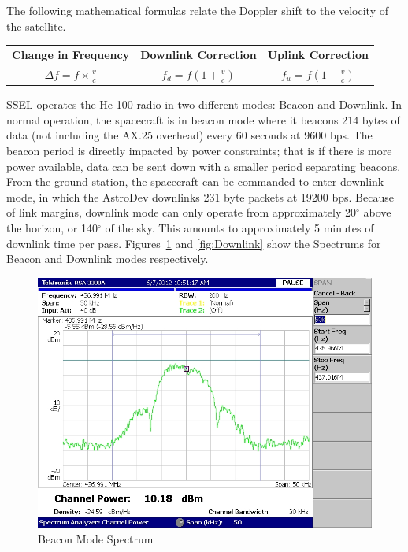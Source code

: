 \documentclass[letter,12pt]{article}
\begin{document}
		The following mathematical formulas relate the Doppler shift to the velocity of the satellite.
		
		\begin{center}
		\begin{tabular}{c c c}
			\textbf{Change in Frequency} & \textbf{Downlink Correction} & \textbf{Uplink Correction} \\
			\Large{$\Delta f = f \times \frac{v}{c}$} & \Large{$f_d = f(1 + \frac{v}{c})$} & \Large{$f_u = f(1 - \frac{v}{c})$} \\
		\end{tabular}
		\end{center}
		
		SSEL operates the He-100 radio in two different modes: Beacon and Downlink.  In normal operation, the spacecraft is in beacon mode where it beacons 214 bytes of data (not including the AX.25 overhead) every 60 seconds at 9600 bps.  The beacon period is directly impacted by power constraints; that is if there is more power available, data can be sent down with a smaller period separating beacons.  From the ground station, the spacecraft can be commanded to enter downlink mode, in which the AstroDev downlinks 231 byte packets at 19200 bps.  Because of link margins, downlink mode can only operate from approximately 20$^\circ$ above the horizon, or 140$^\circ$  of the sky.  This amounts to approximately 5 minutes of downlink time per pass. Figures~\ref{fig:Beacon} and \ref{fig:Downlink} show the Spectrums for Beacon and Downlink modes respectively.
		
		\begin{figure}[h!]
			\centering
			\includegraphics[width=\textwidth]{./PNGs/Beacon_50k_span_9600.png}
			\caption{Beacon Mode Spectrum}
			\label{fig:Beacon}			
		\end{figure}
		
\end{document}
